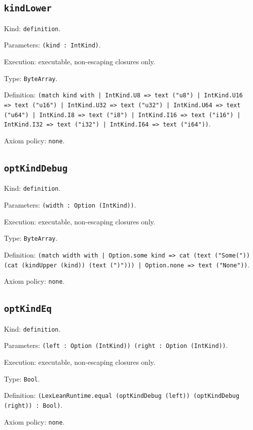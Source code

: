 \documentclass[11pt]{article}
\begin{document}
\subsection*{\texttt{kindLower}}
\noindent Kind: \texttt{definition}.\par
\noindent Parameters: \texttt{(kind : IntKind)}.\par
\noindent Execution: executable, non-escaping closures only.\par
\noindent Type: \texttt{ByteArray}.\par
\noindent Definition: \texttt{(match kind with | IntKind.U8 => text ("u8") | IntKind.U16 => text ("u16") | IntKind.U32 => text ("u32") | IntKind.U64 => text ("u64") | IntKind.I8 => text ("i8") | IntKind.I16 => text ("i16") | IntKind.I32 => text ("i32") | IntKind.I64 => text ("i64"))}.\par
\noindent Axiom policy: \texttt{none}.\par
\subsection*{\texttt{optKindDebug}}
\noindent Kind: \texttt{definition}.\par
\noindent Parameters: \texttt{(width : Option (IntKind))}.\par
\noindent Execution: executable, non-escaping closures only.\par
\noindent Type: \texttt{ByteArray}.\par
\noindent Definition: \texttt{(match width with | Option.some kind => cat (text ("Some(")) (cat (kindUpper (kind)) (text (")"))) | Option.none => text ("None"))}.\par
\noindent Axiom policy: \texttt{none}.\par
\subsection*{\texttt{optKindEq}}
\noindent Kind: \texttt{definition}.\par
\noindent Parameters: \texttt{(left : Option (IntKind)) (right : Option (IntKind))}.\par
\noindent Execution: executable, non-escaping closures only.\par
\noindent Type: \texttt{Bool}.\par
\noindent Definition: \texttt{(LexLeanRuntime.equal (optKindDebug (left)) (optKindDebug (right)) : Bool)}.\par
\noindent Axiom policy: \texttt{none}.\par
\end{document}
